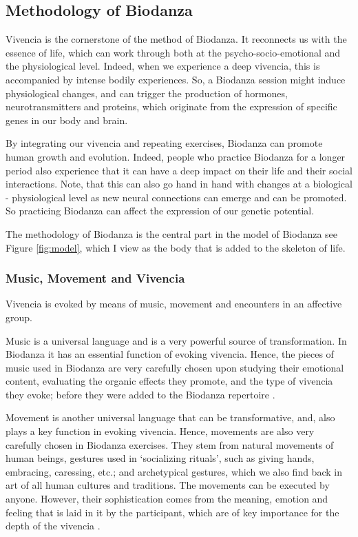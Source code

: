 \documentclass[
  11pt,
]{book}
\begin{document}
\hypertarget{methodology-of-biodanza}{%
\subsection{Methodology of Biodanza}\label{methodology-of-biodanza}}

Vivencia is the cornerstone of the method of Biodanza. It reconnects us with the essence of life, which can work through both at the psycho-socio-emotional and the physiological level. Indeed, when we experience a deep vivencia, this is accompanied by intense bodily experiences. So, a Biodanza session might induce physiological changes, and can trigger the production of hormones, neurotransmitters and proteins, which originate from the expression of specific genes in our body and brain.

By integrating our vivencia and repeating exercises, Biodanza can promote human growth and evolution. Indeed, people who practice Biodanza for a longer period also experience that it can have a deep impact on their life and their social interactions. Note, that this can also go hand in hand with changes at a biological - physiological level as new neural connections can emerge and can be promoted. So practicing Biodanza can affect the expression of our genetic potential.

The methodology of Biodanza is the central part in the model of Biodanza see Figure \ref{fig:model}, which I view as the body that is added to the skeleton of life.

\hypertarget{music-movement-and-vivencia}{%
\subsubsection{Music, Movement and Vivencia}\label{music-movement-and-vivencia}}

Vivencia is evoked by means of music, movement and encounters in an affective group.

Music is a universal language and is a very powerful source of transformation. In Biodanza it has an essential function of evoking vivencia. Hence, the pieces of music used in Biodanza are very carefully chosen upon studying their emotional content, evaluating the organic effects they promote, and the type of vivencia they evoke; before they were added to the Biodanza repertoire \citep{toro2008}.

Movement is another universal language that can be transformative, and, also plays a key function in evoking vivencia. Hence, movements are also very carefully chosen in Biodanza exercises. They stem from natural movements of human beings, gestures used in `socializing rituals', such as giving hands, embracing, caressing, etc.; and archetypical gestures, which we also find back in art of all human cultures and traditions. The movements can be executed by anyone. However, their sophistication comes from the meaning, emotion and feeling that is laid in it by the participant, which are of key importance for the depth of the vivencia \citep{toro2008}.
\end{document}
